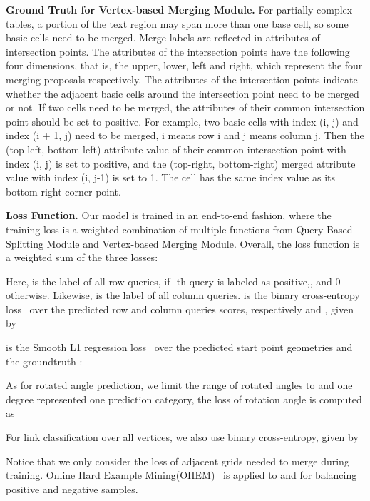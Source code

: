 \documentclass[lettersize,journal]{IEEEtran}
\begin{document}
\textbf{Ground Truth for Vertex-based Merging Module.} For partially complex tables, a portion of the text region may span more than one base cell, so some basic cells need to be merged. Merge labels are reflected in attributes of intersection points. The attributes of the intersection points have the following four dimensions, that is, the upper, lower, left and right, which represent the four merging proposals respectively. The attributes of the intersection points indicate whether the adjacent basic cells around the intersection point need to be merged or not. If two cells need to be merged, the attributes of their common intersection point should be set to positive. For example, two basic cells with index (i, j) and index (i + 1, j) need to be merged, i means row i and j means column j. Then the (top-left, bottom-left) attribute value of their common intersection point with index (i, j) is set to positive, and the (top-right, bottom-right) merged attribute value with index (i, j-1) is set to 1. The cell has the same index value as its bottom right corner point. 

\textbf{Loss Function.} Our model is trained in an end-to-end fashion, where the training loss is a weighted combination of multiple functions from Query-Based Splitting Module and Vertex-based Merging Module. Overall, the loss function is a weighted sum of the three losses:



Here,  is the label of all row queries,  if -th query is labeled as positive,, and 0 otherwise. Likewise,  is the label of all column queries.  is the binary cross-entropy loss~\cite{ruby2020binary} over the predicted row and column queries scores, respectively  and , given by



 is the Smooth L1 regression loss~\cite{girshick2015fast} over the predicted start point geometries  and the groundtruth :



As for rotated angle prediction, we limit the range of rotated angles to  and one degree represented one prediction category, the loss of rotation angle is computed as 


For link classification over all vertices, we also use binary cross-entropy, given by



Notice that we only consider the loss of adjacent grids needed to merge during training. Online Hard Example Mining(OHEM)~\cite{shrivastava2016training} is applied to  and  for balancing positive and negative samples. 
\end{document}
